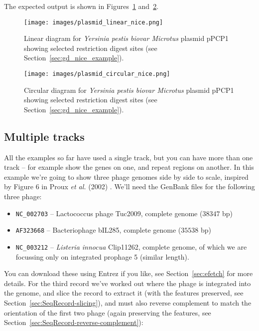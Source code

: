 \noindent The expected output is shown in Figures~\ref{fig:plasmid_linear_nice}
and~\ref{fig:plasmid_circular_nice}.
\begin{figure}[htbp]
\centering
\texttt{[image: images/plasmid\_linear\_nice.png]}
\caption{Linear diagram for \textit{Yersinia pestis biovar Microtus} plasmid
pPCP1 showing selected restriction digest sites (see
Section~\ref{sec:gd_nice_example}).}
\label{fig:plasmid_linear_nice}
\end{figure}
\begin{figure}[htbp]
\centering
\texttt{[image: images/plasmid\_circular\_nice.png]}
\caption{Circular diagram for \textit{Yersinia pestis biovar Microtus} plasmid
pPCP1 showing selected restriction digest sites (see
Section~\ref{sec:gd_nice_example}).}
\label{fig:plasmid_circular_nice}
\end{figure}

\subsection{Multiple tracks}
\label{sec:gd_multiple_tracks}

All the examples so far have used a single track, but you can have more than
one track -- for example show the genes on one, and repeat regions on another.
In this example we're going to show three phage genomes side by side to scale,
inspired by Figure 6 in Proux \textit{et al.} (2002) \cite{proux2002}.
We'll need the GenBank files for the following three phage:
\begin{itemize}
\item \verb|NC_002703| -- Lactococcus phage Tuc2009, complete genome ($38347$ bp)
\item \verb|AF323668| -- Bacteriophage bIL285, complete genome ($35538$ bp)
\item \verb|NC_003212| -- \textit{Listeria innocua} Clip11262, complete genome,
of which we are focussing only on integrated prophage 5 (similar length).
\end{itemize}

You can download these using Entrez if you like, see Section~\ref{sec:efetch}
for more details. For the third record we've worked out where the phage is
integrated into the genome, and slice the record to extract it (with the
features preserved, see Section~\ref{sec:SeqRecord-slicing}), and must also
reverse complement to match the orientation of the first two phage (again
preserving the features, see Section~\ref{sec:SeqRecord-reverse-complement}):

